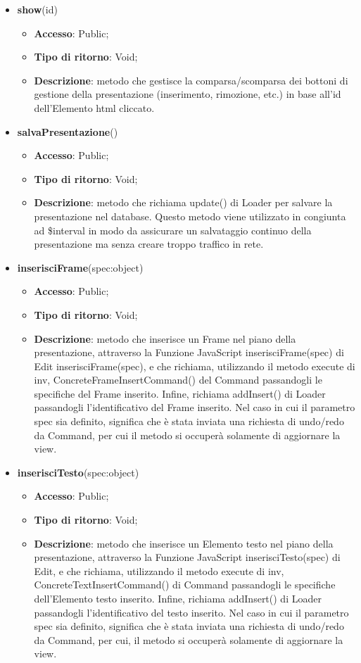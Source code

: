 {{\begin{itemize}
			\item \textbf{show}(id)
			\begin{itemize}
				\item \textbf{Accesso}: Public;
				\item \textbf{Tipo di ritorno}: Void;
				\item \textbf{Descrizione}: metodo che gestisce la comparsa/scomparsa dei bottoni di gestione della presentazione (inserimento, rimozione, etc.) in base all'id dell'Elemento html cliccato.
			\end{itemize}
			\item \textbf{salvaPresentazione}()
			\begin{itemize}
				\item \textbf{Accesso}: Public;
				\item \textbf{Tipo di ritorno}: Void;
				\item \textbf{Descrizione}: metodo che richiama update() di Loader per salvare la presentazione nel database. Questo metodo viene utilizzato in congiunta ad \$interval in modo da assicurare un salvataggio continuo della presentazione ma senza creare troppo traffico in rete.
			\end{itemize}
			\item \textbf{inserisciFrame}(spec:object)
			\begin{itemize}
				\item \textbf{Accesso}: Public;
				\item \textbf{Tipo di ritorno}: Void;
				\item \textbf{Descrizione}: metodo che inserisce un Frame nel piano della presentazione, attraverso la Funzione\ped{g} JavaScript inserisciFrame(spec) di Edit inserisciFrame(spec), e che richiama, utilizzando il metodo execute di inv, ConcreteFrameInsertCommand() del Command passandogli le specifiche del Frame inserito. Infine, richiama addInsert() di Loader passandogli l'identificativo del Frame inserito. Nel caso in cui il parametro spec sia definito, significa che è stata inviata una richiesta di undo/redo da Command, per cui il metodo si occuperà solamente di aggiornare la view.
			\end{itemize}
			\item \textbf{inserisciTesto}(spec:object)
			\begin{itemize}
				\item \textbf{Accesso}: Public;
				\item \textbf{Tipo di ritorno}: Void;
				\item \textbf{Descrizione}: metodo che inserisce un Elemento testo nel piano della presentazione, attraverso la Funzione\ped{g} JavaScript inserisciTesto(spec) di Edit, e che richiama, utilizzando il metodo execute di inv, ConcreteTextInsertCommand() di Command passandogli le specifiche dell'Elemento testo inserito. Infine, richiama addInsert() di Loader passandogli l'identificativo del testo inserito. Nel caso in cui il parametro spec sia definito, significa che è stata inviata una richiesta di undo/redo da Command, per cui, il metodo si occuperà solamente di aggiornare la view.

\end{itemize}
\end{itemize}}}
